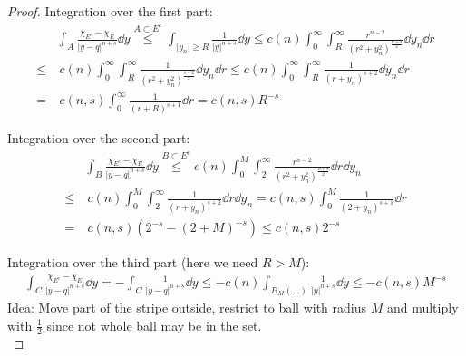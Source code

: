 \begin{proof}
	Integration over the first part:
	\begin{align*}
		     & \int_A \frac{\chi_{E^c} -\chi_E}{\lvert y-q\rvert^{n+s}} \dd{y} \overset{A \subset E^c}{ \leq} \int_{\lvert y_n \rvert \geq R} \frac{1}{\lvert y \rvert^{n+s}} \dd{y} \leq c(n) \int_0^\infty \int_R^\infty \frac{r^{n-2}}{(r^2 +y_n^2)^{\frac{n+s}{2}}} \dd{y_n} \dd{r} \\
		\leq & \ c(n) \int_0^\infty \int_R^\infty \frac{1}{(r^2 +y_n^2)^{\frac{s+2}{2}}} \dd{y_n} \dd{r} \leq c(n) \int_0^\infty \int_R^\infty \frac{1}{(r+y_n)^{s+2}} \dd{y_n} \dd{r} \\
		=    & \ c(n,s) \int_0^\infty \frac{1}{(r+R)^{s+1}} \dd{r} = c(n,s) R^{-s}
	\end{align*}

	Integration over the second part:
	\begin{align*}
		     & \int_B \frac{\chi_{E^c} -\chi_E}{\lvert y-q\rvert^{n+s}} \dd{y} \overset{B \subset E^c}{ \leq} c(n) \int_0^M \int_2^\infty \frac{r^{n-2}}{(r^2 +y_n^2)^{\frac{n+s}{2}}} \dd{r} \dd{y_n} \\
		\leq & \ c(n) \int_0^M \int_2^\infty \frac{1}{( r+y_n)^{s+2}} \dd{r} \dd{y_n} = c(n,s) \int_0^M \frac{1}{(2+y_n)^{s+1}} \dd{r} \\
		=    & \ c(n,s)(2^{-s}-(2+M)^{-s}) \leq c(n,s) 2^{-s}
	\end{align*}

	Integration over the third part (here we need \( R > M \)):
	\begin{align*}
		\int_C \frac{\chi_{E^c} -\chi_E}{\lvert y-q\rvert^{n+s}} \dd{y} = - \int_C \frac{1}{\lvert y-q \rvert^{n+s}} \dd{y} \leq -c(n) \int_{B_M (\ldots)} \frac{1}{\lvert y\rvert^{n+s}} \dd{y} \leq -c(n,s) M^{-s}
	\end{align*}
	Idea: Move part of the stripe outside, restrict to ball with radius \( M \) and
	multiply with \( \frac{1}{2} \) since not whole ball may be in the set.\\


\end{proof}
